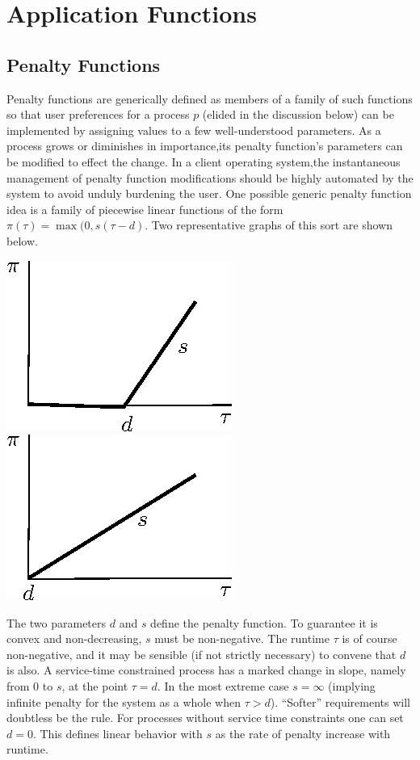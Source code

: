 \section{Application Functions}
\subsection*{Penalty Functions}

Penalty functions  are generically defined as members of a family of such functions so that user preferences for a process $p$ (elided in the discussion below) can be implemented by assigning values to a few well-understood parameters.  As a process grows or diminishes in importance,its penalty function's parameters can be modified to effect the change.  In a client operating system,the instantaneous management of penalty function modifications should be highly automated by the system to avoid unduly burdening the user.
One possible generic penalty function idea is a family of piecewise linear functions of the form
$\pi(\tau) = \max(0, s(\tau - d)$.
Two representative graphs of this sort are shown below.

\includegraphics*{Penalty1.eps}
\includegraphics*{Penalty2.eps}

The two parameters $d$ and $s$ define the penalty function.
To guarantee it is convex and non-decreasing, $s$ must be non-negative.
The runtime $\tau$  is of course non-negative,
and it may be sensible (if not strictly necessary) to convene that $d$ is also.
A service-time constrained process has a marked change in slope, namely from 0 to $s$, at the point $\tau= d$.
In the most extreme case $s = \infty$ (implying infinite penalty for the system as a whole when $\tau > d$).  ``Softer'' requirements will doubtless be the rule.
For processes without service time constraints one can set $d = 0$.
This defines linear behavior with $s$ as the rate of penalty increase with runtime.

